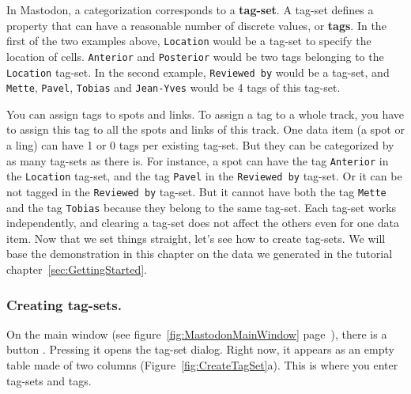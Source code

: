 In Mastodon, a categorization corresponds to a \textbf{tag-set}.
A tag-set defines a property that can have a reasonable number of discrete values, or \textbf{tags}.
In the first of the two examples above, \texttt{Location} would be a tag-set to specify the location of cells.
\texttt{Anterior} and \texttt{Posterior} would be two tags belonging to the \texttt{Location} tag-set.
In the second example, \texttt{Reviewed by} would be a tag-set, and \texttt{Mette}, \texttt{Pavel}, \texttt{Tobias} and \texttt{Jean-Yves} would be 4 tags of this tag-set.

You can assign tags to spots and links.
To assign a tag to a whole track, you have to assign this tag to all the spots and links of this track.
One data item (a spot or a ling) can have 1 or 0 tags per existing tag-set.
But they can be categorized by as many tag-sets as there is.
For instance, a spot can have the tag \texttt{Anterior} in the \texttt{Location} tag-set, and the tag \texttt{Pavel} in the \texttt{Reviewed by} tag-set. 
Or it can be not tagged in the \texttt{Reviewed by} tag-set.
But it cannot have both the tag \texttt{Mette} and the tag \texttt{Tobias} because they belong to the same tag-set.
Each tag-set works independently, and clearing a tag-set does not affect the others even for one data item.
Now that we set things straight, let's see how to create tag-sets.
We will base the demonstration in this chapter on the data we generated in the tutorial chapter~\ref{sec:GettingStarted}.


\subsubsection{Creating tag-sets.}

On the main window (see figure~\ref{fig:MastodonMainWindow} page~\pageref{fig:MastodonMainWindow}), there is a button . 
Pressing it opens the tag-set dialog. 
Right now, it appears as an empty table made of two columns (Figure~\ref{fig:CreateTagSet}a). 
This is where you enter tag-sets and tags.

